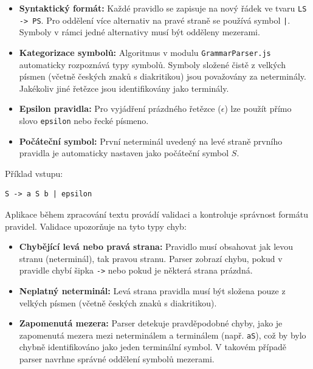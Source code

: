 \begin{itemize}
    \item \textbf{Syntaktický formát:} Každé pravidlo se zapisuje na nový řádek ve tvaru \texttt{LS -> PS}. Pro oddělení více alternativ na pravé straně se používá symbol \texttt{|}. Symboly v rámci jedné alternativy musí být odděleny mezerami.
    
    \item \textbf{Kategorizace symbolů:} Algoritmus v modulu \texttt{GrammarParser.js} automaticky rozpoznává typy symbolů. Symboly složené čistě z velkých písmen (včetně českých znaků s diakritikou) jsou považovány za neterminály. Jakékoliv jiné řetězce jsou identifikovány jako terminály.
    
    \item \textbf{Epsilon pravidla:} Pro vyjádření prázdného řetězce ($\epsilon$) lze použít přímo slovo \texttt{epsilon} nebo řecké písmeno.
    
    \item \textbf{Počáteční symbol:} První neterminál uvedený na levé straně prvního pravidla je automaticky nastaven jako počáteční symbol \( S \).
\end{itemize}

Příklad vstupu:
\begin{verbatim}
S -> a S b | epsilon
\end{verbatim}

Aplikace během zpracování textu provádí validaci a kontroluje správnost formátu pravidel. Validace upozorňuje na tyto typy chyb:

\begin{itemize}
    \item \textbf{Chybějící levá nebo pravá strana:} Pravidlo musí obsahovat jak levou stranu (neterminál), tak pravou stranu. Parser zobrazí chybu, pokud v pravidle chybí šipka \texttt{->} nebo pokud je některá strana prázdná.
    
    \item \textbf{Neplatný neterminál:} Levá strana pravidla musí být složena pouze z velkých písmen (včetně českých znaků s diakritikou).
    
    \item \textbf{Zapomenutá mezera:} Parser detekuje pravděpodobné chyby, jako je zapomenutá mezera mezi neterminálem a terminálem (např. \texttt{aS}), což by bylo chybně identifikováno jako jeden terminální symbol. V takovém případě parser navrhne správné oddělení symbolů mezerami.
\end{itemize}

